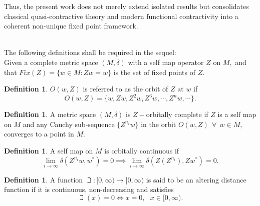 \documentclass[11pt,reqno]{amsart}
\theoremstyle{definition}
\newtheorem{definition}[theorem]{Definition}
\theoremstyle{remark}
\numberwithin{equation}{section}
\begin{document}
	Thus, the present work does not merely extend isolated results but consolidates classical quasi-contractive theory and modern functional contractivity into a coherent non-unique fixed point framework.\\
	~~\\ 
	\par The following definitions shall be required in the sequel:\\
	Given a complete metric space $(M, \delta)$ with a self map operator $Z$ on $M,$ and that $Fix(Z) = \{w \in M : Zw = w\}$ is the set of fixed points of $Z.$
	\begin{definition}\cite{Ciric1974a,Olatinwo2019}
	$O(w,Z)$ is referred to as the orbit of $Z$ at $w$ if
	$$O(w,Z)= \{w,Zw,Z^2w, Z^3w, \cdots, Z^nw, \cdots\}.$$	
	\end{definition}
	\begin{definition}\cite{Ciric1974a,Olatinwo2019}
	A metric space $(M,\delta)$ is $Z-$orbitally complete if $Z$ is a self map on $M$ and any Cauchy sub-sequence $\{Z^{n_i}w\}$ in the orbit $O(w,Z)~~\forall~~ w \in M,$ converges to a point in $M.$ 	
	\end{definition}
	\begin{definition}\cite{Olatinwo2019}
	A self map on $M$ is orbitally continuous if 
	$$\lim_{i \to \infty} \delta(Z^{n_i}w,w^*)=0 \implies \lim_{i \to \infty} \delta(Z(Z^{n_i}),Zw^*)=0.$$
\end{definition}
\begin{definition}\cite{Ansari2014}
	A function $\beth: [0,\infty) \to [0,\infty)$ is said to be an altering distance function if it is continuous, non-decreasing and satisfies
	$$\beth(x)=0 \iff x=0,~~~x \in [0,\infty).$$
\end{definition}
\end{document}
